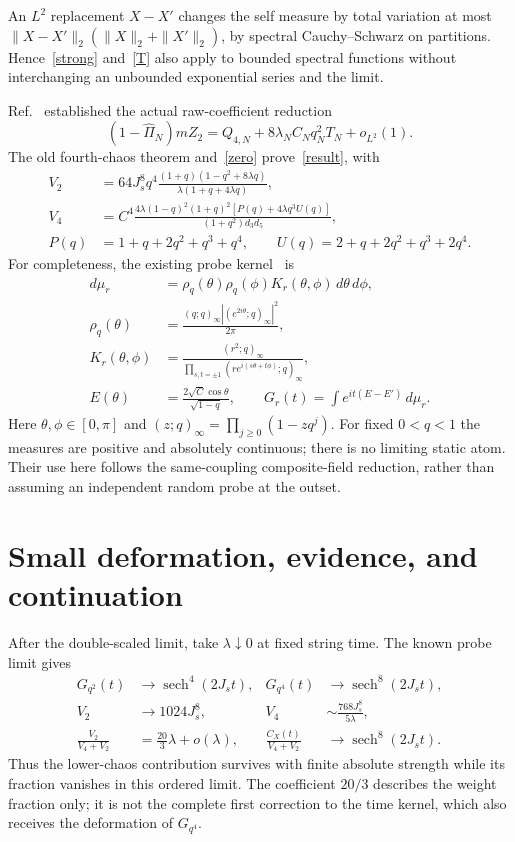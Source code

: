 \documentclass[11pt,a4paper]{article}
\newcommand{\J}{J_s}
\begin{document}
An $L^2$ replacement $X-X'$ changes the self measure by total
variation at most $\|X-X'\|_2(\|X\|_2+\|X'\|_2)$, by spectral
Cauchy--Schwarz on partitions. Hence~\eqref{strong} and~\eqref{T}
also apply to bounded spectral functions without interchanging an
unbounded exponential series and the limit.

Ref.~\cite{desc} established the actual raw-coefficient reduction
\begin{equation}
 (1-\widehat\Pi_N)mZ_2
 =Q_{4,N}+8\lambda_N C_Nq_N^2T_N+o_{L^2}(1).
\end{equation}
The old fourth-chaos theorem and~\eqref{zero} prove~\eqref{result},
with
\begin{align}
 V_2&=64\J^8q^4
 \frac{(1+q)(1-q^2+8\lambda q)}{\lambda(1+q+4\lambda q)},\\
 V_4&=C^4\frac{4\lambda(1-q)^2(1+q)^2
 [P(q)+4\lambda q^3 U(q)]}{(1+q^2)d_3d_5},\\
 P(q)&=1+q+2q^2+q^3+q^4,\qquad
 U(q)=2+q+2q^2+q^3+2q^4.
\end{align}
For completeness, the existing probe kernel~\cite{TT,BNR} is
\begin{align}
 d\mu_r&=\rho_q(\theta)\rho_q(\phi)K_r(\theta,\phi)
                      \,d\theta\,d\phi,\\
 \rho_q(\theta)&=\frac{(q;q)_\infty
                  |(e^{2i\theta};q)_\infty|^2}{2\pi},\\
 K_r(\theta,\phi)&=\frac{(r^2;q)_\infty}
 {\prod_{s,t=\pm1}(re^{i(s\theta+t\phi)};q)_\infty},\\
 E(\theta)&=\frac{2\sqrt C\cos\theta}{\sqrt{1-q}},\qquad
 G_r(t)=\int e^{it(E-E')}\,d\mu_r.
\end{align}
Here $\theta,\phi\in[0,\pi]$ and $(z;q)_\infty=\prod_{j\geq0}(1-zq^j)$.
For fixed $0<q<1$ the measures are positive and absolutely continuous;
there is no limiting static atom. Their use here follows the
same-coupling composite-field reduction, rather than assuming an
independent random probe at the outset.

\newpage
\section{Small deformation, evidence, and continuation}
After the double-scaled limit, take $\lambda\downarrow0$ at fixed
string time. The known probe limit gives
\begin{align}
 G_{q^2}(t)&\longrightarrow\operatorname{sech}^4(2\J t),&
 G_{q^4}(t)&\longrightarrow\operatorname{sech}^8(2\J t),\\
 V_2&\longrightarrow1024\J^8,&
 V_4&\sim\frac{768\J^8}{5\lambda},\\
 \frac{V_2}{V_4+V_2}&=\frac{20}{3}\lambda+o(\lambda),&
 \frac{C_X(t)}{V_4+V_2}&\longrightarrow\operatorname{sech}^8(2\J t).
\end{align}
Thus the lower-chaos contribution survives with finite absolute
strength while its fraction vanishes in this ordered limit.
The coefficient $20/3$ describes the weight fraction only; it is
not the complete first correction to the time kernel, which also
receives the deformation of $G_{q^4}$.
\end{document}
